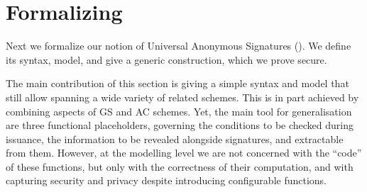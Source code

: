 \section{Formalizing \UAS}
\label{sec:formal-uas}


Next we formalize our notion of Universal Anonymous Signatures
(\UAS). We define its syntax, model, and give a generic construction, which
we prove secure. 

The main contribution of this section is giving a simple syntax and model that
still allow spanning a wide variety of related schemes. This is in part
achieved by combining aspects of GS and AC schemes. Yet, the main tool for
generalisation are three functional placeholders, governing the conditions to be
checked during issuance, the information to be revealed alongside signatures,
and extractable from them. However, at the modelling level we are not concerned
with the ``code'' of these functions, but only with the correctness of their
computation, and with capturing security and privacy despite introducing
configurable functions.


